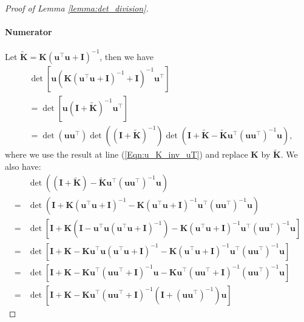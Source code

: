 \begin{proof}[Proof of Lemma \ref{lemma:det_division}]
\paragraph{Numerator}
Let $\widetilde{\mathbf{K}} = \mathbf{K} (\mathbf{u}^\top \mathbf{u} + \mathbf{I})^{-1}$, then we have
\begin{align*}
    &\det [\mathbf{u}\left(\mathbf{K}(\mathbf{u}^\top\mathbf{u}+\mathbf{I})^{-1} + \mathbf{I}\right)^{-1}\mathbf{u}^\top] 
    \\
    &= \det [\mathbf{u}\left( \mathbf{I}+\widetilde{\mathbf{K}} \right)^{-1}\mathbf{u}^\top] 
    \\
    & = \det (\mathbf{u} \mathbf{u}^\top) \det \left((\mathbf{I}+\widetilde{\mathbf{K}})^{-1}\right) \det \left( \mathbf{I} + \widetilde{\mathbf{K}} - \widetilde{\mathbf{K}}\mathbf{u}^\top (\mathbf{u} \mathbf{u}^\top)^{-1} \mathbf{u}\right),
\end{align*}
where we use the result at line  (\ref{Eqn:u_K_inv_uT}) and replace $\mathbf{K}$ by $\widetilde{\mathbf{K}}$. We also have: 
\begin{align*}
    & \det \left( (\mathbf{I} + \widetilde{\mathbf{K}}) - \widetilde{\mathbf{K}}\mathbf{u}^\top (\mathbf{u} \mathbf{u}^\top)^{-1} \mathbf{u}\right)
\\
    = &\det \left( \mathbf{I} + \mathbf{K} (\mathbf{u}^\top \mathbf{u} + \mathbf{I})^{-1} - \mathbf{K} (\mathbf{u}^\top \mathbf{u} + \mathbf{I})^{-1}\mathbf{u}^\top (\mathbf{u} \mathbf{u}^\top)^{-1} \mathbf{u}\right)
\\
    = &  \det \left[ \mathbf{I} + \mathbf{K} \left( \mathbf{I} - \mathbf{u}^\top \mathbf{u} (\mathbf{u}^\top \mathbf{u} + \mathbf{I})^{-1} \right) - \mathbf{K} (\mathbf{u}^\top \mathbf{u} + \mathbf{I})^{-1}\mathbf{u}^\top (\mathbf{u} \mathbf{u}^\top)^{-1} \mathbf{u}\right] 
\\
    = &  \det \left[ \mathbf{I} + \mathbf{K} - \mathbf{K} \mathbf{u}^\top \mathbf{u} (\mathbf{u}^\top \mathbf{u} + \mathbf{I})^{-1}  - \mathbf{K} (\mathbf{u}^\top \mathbf{u} + \mathbf{I})^{-1}\mathbf{u}^\top (\mathbf{u} \mathbf{u}^\top)^{-1} \mathbf{u}\right] 
\\
    = &  \det \left[ \mathbf{I} + \mathbf{K} - \mathbf{K} \mathbf{u}^\top (\mathbf{u} \mathbf{u}^\top + \mathbf{I})^{-1}\mathbf{u}  - \mathbf{K} \mathbf{u}^\top ( \mathbf{u}\mathbf{u}^\top + \mathbf{I})^{-1} (\mathbf{u} \mathbf{u}^\top)^{-1} \mathbf{u}\right] 
\\ 
    = &  \det \left[ \mathbf{I} + \mathbf{K} - \mathbf{K} \mathbf{u}^\top (\mathbf{u} \mathbf{u}^\top + \mathbf{I})^{-1} \left( \mathbf{I} + (\mathbf{u} \mathbf{u}^\top)^{-1} \right)  \mathbf{u} \right] 

\end{align*}
\end{proof}
